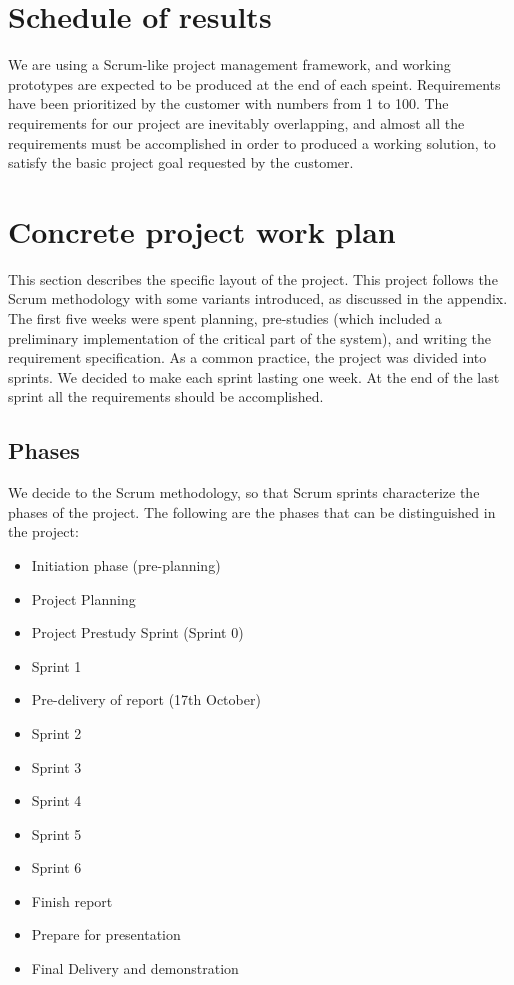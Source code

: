 \documentclass[11pt,a4paper,titlepage,oneside]{report}
\begin{document}
\section{Schedule of results}
We are using a Scrum-like project management framework, and working prototypes are expected to be produced at the end of each speint. Requirements have been prioritized by the customer with numbers from 1 to 100. The requirements for our project are inevitably overlapping, and almost all the requirements must be accomplished in order to produced a working solution, to satisfy the basic project goal requested by the customer.

\section{Concrete project work plan}
This section describes the specific layout of the project. This project follows the Scrum methodology with some variants introduced, as discussed in the appendix. The first five weeks were spent planning, pre-studies (which included a preliminary implementation of the critical part of the system), and writing the requirement specification. As a common practice, the project was divided into sprints. We decided to make each sprint lasting one week. At the end of the last sprint all the requirements should be accomplished.
\subsection{Phases}
We decide to the Scrum methodology, so that Scrum sprints characterize the phases of the project.
The following are the phases that can be distinguished in the project:
\begin{itemize}
\item Initiation phase (pre-planning)
\item Project Planning
\item Project Prestudy Sprint (Sprint 0)

\item Sprint 1
\item Pre-delivery of report (17th October)

\item Sprint 2
\item Sprint 3
\item Sprint 4
\item Sprint 5
\item Sprint 6

\item Finish report
\item Prepare for presentation
\item Final Delivery and demonstration
\end{itemize}
\end{document}
